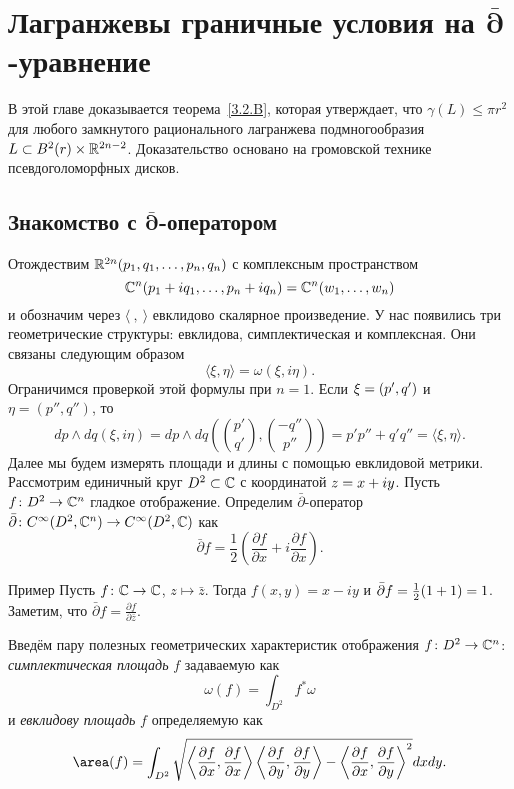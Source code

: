 \chapter
[\texorpdfstring{$\bm{\bar\partial}$-уравнение}{∂-уравнение}]
{Лагранжевы граничные условия на $\bm{\bar\partial}$-уравнение}

В этой главе доказывается теорема~\ref{3.2.B}, которая утверждает, что $\gamma (L) \le \pi r^2$ для любого замкнутого рационального лагранжева подмногообразия $L \subset B^2 (r) \times \mathbb{R}^{2n-2}$.
Доказательство основано на громовской технике псевдоголоморфных дисков.

\section[\texorpdfstring{Знакомство с $\bar\partial$-оператором}{Знакомство с ∂-оператором}]{Знакомство с $\bm{\bar\partial}$-оператором}\label{sec:4.1}

Отождествим $\mathbb{R}^{2n} (p_1,q_1,\dots, p_n, q_n)$ с комплексным пространством
\[\mathbb{C}^n (p_1 + iq_1,\dots, p_n + iq_n)
=
\mathbb{C}^n (w_1,\dots, w_n)\]
и обозначим через $\langle\ ,\  \rangle$ евклидово скалярное произведение.
У нас появились три геометрические структуры: евклидова, симплектическая и комплексная.
Они связаны следующим образом
\[\langle \xi, \eta\rangle = \omega (\xi, i\eta).\]
Ограничимся проверкой этой формулы при $n = 1$.
Если $\xi \z= (p', q')$ и $\eta = (p'', q'')$, то
\[dp\wedge dq(\xi, i\eta)
=
dp\wedge dq\left(\binom{p'}{q'},\binom{-q''}{p''}\right)
=
p' p'' + q' q''
=
\langle\xi, \eta\rangle.\]
Далее мы будем измерять площади и длины с помощью евклидовой метрики.
Рассмотрим единичный круг $D^2 \subset \mathbb{C}$ с координатой $z \z= x \z+ iy$.
Пусть $f\colon D^2 \to \mathbb{C}^n$ гладкое отображение.
Определим $\bar\partial$-оператор $\bar\partial\colon C^\infty (D^2, \mathbb{C}^n) \to C^\infty  (D^2, \mathbb{C})$ как 
\[\bar\partial f=\frac12\left(\frac{\partial f}{\partial x} + i \frac{\partial f}{\partial x}\right).\]

\begin{ex*}{Пример}
Пусть $f\colon \mathbb{C} \to \mathbb{C}$, $z \mapsto \bar z$.
Тогда $f(x,y)=x-iy$ и $\bar\partial f \z= \tfrac12(1+1)=1$.
Заметим, что $\bar\partial f  = \frac{\partial f}{\partial \bar z}$.
\end{ex*}

Введём пару полезных геометрических характеристик отображения $f\colon D^2 \to \mathbb{C}^n$:
\emph{симплектическая площадь} $f$ задаваемую как
\[\omega(f) =\int_{D^2}f^\ast\omega\]
и \emph{евклидову площадь} $f$ определяемую как
\[\area(f)
=\int_{D^2}
\sqrt{
\left\langle\frac{\partial f}{\partial x},\frac{\partial f}{\partial x}\right\rangle
\left\langle \frac{\partial f}{\partial y},\frac{\partial f}{\partial y}\right\rangle
-
\left\langle\frac{\partial f}{\partial x},\frac{\partial f}{\partial y}\right\rangle^2
}
dxdy.
\]

